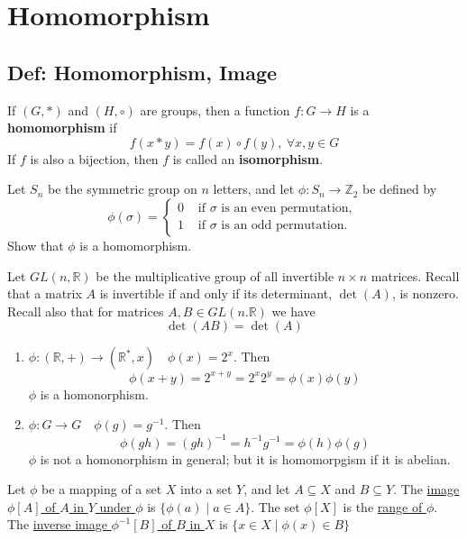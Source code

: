\documentclass[11pt]{elegantbook}
\begin{document}
\section{Homomorphism}
\subsection{Def: Homomorphism, Image}
\begin{definition}
If $(G,*)$ and $(H,\circ)$ are groups, then a function $f:G \rightarrow	H$ is a \textbf{homomorphism} if $$f(x*y)=f(x)\circ f(y),\ \forall x,y\in G$$
If $f$ is also a bijection, then $f$ is called an \textbf{isomorphism}.
\end{definition}

\begin{example}
    Let $S_{n}$ be the symmetric group on $n$ letters, and let $\phi: S_{n} \rightarrow \mathbb{Z}_{2}$ be defined by $$\phi(\sigma)= \begin{cases}0 & \text { if } \sigma \text { is an even permutation, } \\ 1 & \text { if } \sigma \text { is an odd permutation. }\end{cases}$$
    Show that $\phi$ is a homomorphism.
\end{example}

\begin{example}
    Let $G L(n, \mathbb{R})$ be the multiplicative group of all invertible $n \times n$ matrices. Recall that a matrix $A$ is invertible if and only if its determinant, $\operatorname{det}(A)$, is nonzero. Recall also that for matrices $A, B \in G L(n . \mathbb{R})$ we have
    $$
    \operatorname{det}(A B)=\operatorname{det}(A)
    $$
\end{example}

\begin{example}
\end{example}
\begin{enumerate}
    \item $\phi: (\mathbb{R},+) \rightarrow	(\mathbb{R}^*,x)\quad \phi(x)=2^x$. Then
    $$\phi(x+y)=2^{x+y}=2^x2^y=\phi(x)\phi(y)$$ $\phi$ is a homonorphism.
    \item $\phi: G \rightarrow	G\quad \phi(g)=g^{-1}$. Then
    $$\phi(gh)=(gh)^{-1}=h^{-1}g^{-1}=\phi(h)\phi(g)$$ $\phi$ is not a homonorphism in general; but it is homomorpgism if it is abelian.
\end{enumerate}

\begin{definition}
    Let $\phi$ be a mapping of a set $X$ into a set $Y$, and let $A \subseteq X$ and $B \subseteq Y$. The \underline{image $\phi[A]$ of $A$ in $Y$ under $\phi$} is $\{\phi(a) \mid a \in A\}$. The set $\phi[X]$ is the \underline{range of $\phi$}. The \underline{inverse image $\phi^{-1}[B]$ of $B$ in $X$} is $\{x \in X \mid \phi(x) \in B\}$
\end{definition}
\end{document}
